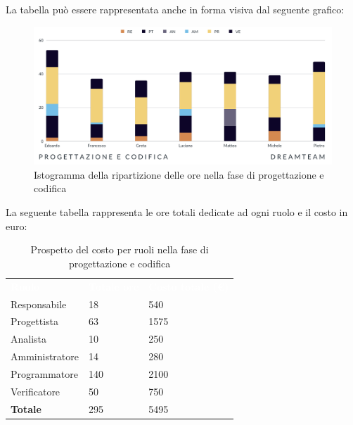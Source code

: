 La tabella può essere rappresentata anche in forma visiva dal seguente grafico:
\begin{figure}[H]
\centering
\includegraphics[scale=0.65]{Sezioni/SezioniPreventivo/grafici/Progettazione_codifica.png}
\caption{Istogramma della ripartizione delle ore nella fase di progettazione e codifica}
\end{figure}

La seguente tabella rappresenta le ore totali dedicate ad ogni ruolo e il costo in euro:

\begin{table}[H]
\begin{center}
\renewcommand{\arraystretch}{1.5}
\begin{tabular}{ m{}<{\centering}  m{}<{\centering} m{}<{\centering}}
	\rowcolor{darkblue}
	\textcolor{white}{\textbf{Ruolo}}&\textcolor{white}{\textbf{Totale ore}}&\textcolor{white}{\textbf{Costo totale (\euro)}}\\ 

	Responsabile  & 18 & 540 \\	
	
	Progettista & 63 & 1575 \\
	
	Analista & 10 & 250 \\

	Amministratore & 14 & 280 \\
	
	Programmatore & 140 & 2100 \\
	
	Verificatore & 50 & 750 \\
	
	\textbf{Totale} & 295 & 5495 \\
	
\end{tabular}
\caption{Prospetto del costo per ruoli nella fase di progettazione e codifica}
\end{center}
\end{table}

